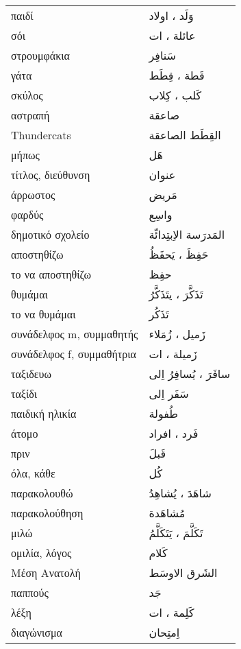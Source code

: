 \documentclass[twocolumn,a4paper]{article}
\newcommand{\ar}[1]{\textarabic{#1}}
\newcommand{\pl}{\raisebox{0.15ex}{\footnotesize ◍}}
\newcommand{\normpl}[1]{\ar{ #1، ات }}
\newcommand{\vrf}{\raisebox{0.15ex}{\footnotesize ◉}}
\newcommand{\mas}{\raisebox{0.15ex}{\footnotesize ◫}}
\begin{document}
\begin{mpsupertabular}{ P{0.5\textwidth} P{0.5\textwidth} }
παιδί \pl      & \ar{ وَلَد ، اولاد } \\
σόι \pl       & \normpl{ عائلة } \\
στρουμφάκια    & \ar{ سَنافِر } \\
γάτα \pl       & \ar{ قَطة ، قِطَط } \\
σκύλος \pl     & \ar{ كَلب ، كِلاب  } \\
αστραπή        & \ar{ صاعقة } \\
Τhundercats   & \ar{ القِطَط الصاعقة } \\
μήπως          & \ar{ هَل } \\
τίτλος, διεύθυνση & \ar{ عنوان } \\
άρρωστος       & \ar{ مَريض } \\
φαρδύς         & \ar{ واسِع } \\
δημοτικό σχολείο    & \ar{ المَدرَسة الاِبتِدائّة } \\
αποστηθίζω \vrf & \ar{ حَفِظَ ، يَحفَظُ } \\
το να αποστηθίζω \mas & \ar{ حفِظ } \\
θυμάμαι \vrf   & \ar{ تَذَكَّرَ ، يتَذَكَّرُ } \\  %
το να θυμάμαι \mas & \ar{ تَذَكُر } \\
συνάδελφος m, συμμαθητής \pl & \ar{ زَميل ، زُمَلاء } \\
συνάδελφος f, συμμαθήτρια \pl & \normpl{ زَميلة } \\
ταξιδευω \vrf  & \ar{ سافَرَ ، يُسافِرُ اِلى } \\
ταξίδι \mas    & \ar{ سَفَر اِلى } \\
παιδική ηλικία & \ar{ طُفولة } \\
άτομο \pl      & \ar{ فَرد ، افراد } \\
πριν           & \ar{ قَبلَ } \\
όλα, κάθε       & \ar{ كُل } \\
παρακολουθώ \vrf & \ar{ شاهَدَ ، يُشاهِدُ } \\
παρακολούθηση \mas & \ar{ مُشاهَدة } \\
μιλώ \vrf      & \ar{ تَكَلَّمَ ، يَتَكَلَّمُ } \\
ομιλία, λόγος \mas & \ar{ كَلام } \\
Μέση Ανατολή   & \ar{ الشَرق الاوسَط } \\
παππούς        & \ar{ جَد } \\
λέξη \pl       & \normpl{ كَلِمة } \\
διαγώνισμα     & \ar{ اِمتِحان } \\

\end{mpsupertabular}
\end{document}
